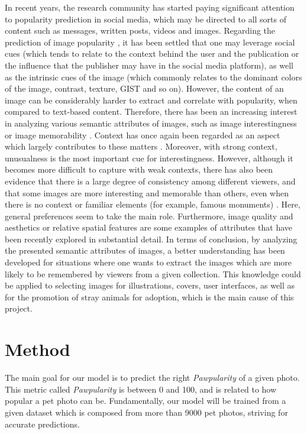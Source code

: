 \documentclass{article}
\begin{document}
In recent years, the research community has started paying significant attention to popularity prediction in social media, which may be directed to all sorts of content such as messages, written posts, videos and images. Regarding the prediction of image popularity \cite{khosla2014what}, it has been settled that one may leverage social cues (which tends to relate to the context behind the user and the publication or the influence that the publisher may have in the social media platform), as well as the intrinsic cues of the image (which commonly relates to the dominant colors of the image, contrast, texture, GIST \cite{Oliva2004ModelingTS} and so on). However, the content of an image can be considerably harder to extract and correlate with popularity, when compared to text-based content. Therefore, there has been an increasing interest in analyzing various semantic attributes of images, such as image interestingness \cite{m.2013the} or image memorability \cite{p.2011what, khosla2015understanding}. Context has once again been regarded as an aspect which largely contributes to these matters \cite{m.2013the}. Moreover, with strong context, unusualness is the most important cue for interestingness. However, although it becomes more difficult to capture with weak contexts, there has also been evidence that there is a large degree of consistency among different viewers, and that some images are more interesting and memorable than others, even when there is no context or familiar elements (for example, famous monuments) \cite{p.2011what}. Here, general preferences seem to take the main role. Furthermore, image quality and  aesthetics \cite{5995467} or relative spatial features \cite{kim2013relative} are some examples of attributes that have been recently explored in substantial detail. In terms of conclusion, by analyzing the presented semantic attributes of images, a better understanding has been developed for situations where one wants to extract the images which are more likely to be remembered by viewers from a given collection. This knowledge could be applied to selecting images for illustrations, covers, user interfaces, as well as for the promotion of stray animals for adoption, which is the main cause of this project.

\section{Method}
The main goal for our model is to predict the right \textit{Pawpularity} of a given photo. This metric called \textit{Pawpularity} is between 0 and 100, and is related to how popular a pet photo can be. Fundamentally, our model will be trained from a given dataset which is composed from more than 9000 pet photos, striving for accurate predictions.
\end{document}
